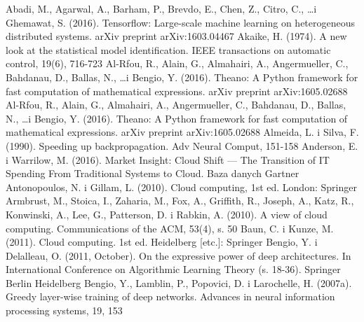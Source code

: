 \documentclass[12pt,a4paper,twoside]{article}
\begin{document}
\begin{thebibliography}{99}
\setlength{\itemsep}{0pt}%
 Abadi, M., Agarwal, A., Barham, P., Brevdo, E., Chen, Z., Citro, C., \ldots i Ghemawat, S. (2016). Tensorflow: Large-scale machine learning on heterogeneous distributed systems. arXiv preprint arXiv:1603.04467
 Akaike, H. (1974). A new look at the statistical model identification. IEEE transactions on automatic control, 19(6), 716-723
 Al-Rfou, R., Alain, G., Almahairi, A., Angermueller, C., Bahdanau, D., Ballas, N., \ldots i Bengio, Y. (2016). Theano: A Python framework for fast computation of mathematical expressions. arXiv preprint arXiv:1605.02688
 Al-Rfou, R., Alain, G., Almahairi, A., Angermueller, C., Bahdanau, D., Ballas, N., \ldots i Bengio, Y. (2016). Theano: A Python framework for fast computation of mathematical expressions. arXiv preprint arXiv:1605.02688
 Almeida, L. i Silva, F. (1990). Speeding up backpropagation. Adv Neural Comput, 151-158
 Anderson, E. i Warrilow, M. (2016). Market Insight: Cloud Shift — The Transition of IT Spending From Traditional Systems to Cloud. Baza danych Gartner
 Antonopoulos, N. i Gillam, L. (2010). Cloud computing, 1st ed. London: Springer
 Armbrust, M., Stoica, I., Zaharia, M., Fox, A., Griffith, R., Joseph, A., Katz, R., Konwinski, A., Lee, G., Patterson, D. i Rabkin, A. (2010). A view of cloud computing. Communications of the ACM, 53(4), s. 50
 Baun, C. i Kunze, M. (2011). Cloud computing. 1st ed. Heidelberg [etc.]: Springer
 Bengio, Y. i Delalleau, O. (2011, October). On the expressive power of deep architectures. In International Conference on Algorithmic Learning Theory (s. 18-36). Springer Berlin Heidelberg
 Bengio, Y., Lamblin, P., Popovici, D. i Larochelle, H. (2007a). Greedy layer-wise training of deep networks. Advances in neural information processing systems, 19, 153

\end{thebibliography}
\end{document}
